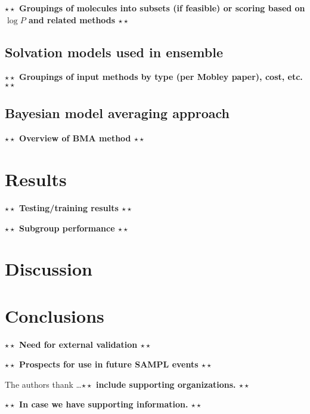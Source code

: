 \documentclass[journal=jctcce,manuscript=article]{achemso}
\newcommand{\todo}[1]{\textbf{$\star \star$ {#1} $\star \star$}}
\begin{document}
\todo{Groupings of molecules into subsets (if feasible) or scoring based on $\log P$ and related methods}

\subsection{Solvation models used in ensemble}

\todo{Groupings of input methods by type (per Mobley paper), cost, etc.}

\subsection{Bayesian model averaging approach}

\todo{Overview of BMA method}

\section{Results}

\todo{Testing/training results}

\todo{Subgroup performance}

\section{Discussion}

\section{Conclusions}

\todo{Need for external validation}

\todo{Prospects for use in future SAMPL events}

\begin{acknowledgement}

The authors thank \ldots \todo{include supporting organizations.}

\end{acknowledgement}

\begin{suppinfo}

\todo{In case we have supporting information.}

\end{suppinfo}


\end{document}
